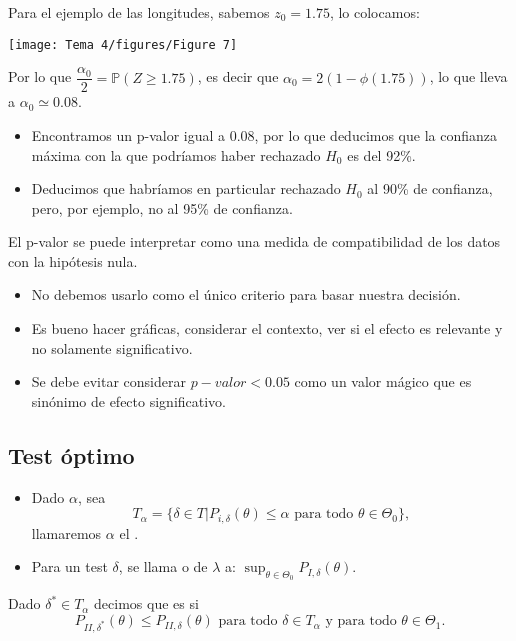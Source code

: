 Para el ejemplo de las longitudes, sabemos $z_0=1.75$, lo colocamos:
\begin{center}
    \texttt{[image: Tema 4/figures/Figure 7]}
\end{center}
Por lo que $\dfrac{\alpha_0}{2}=\mathbb{P}(Z\ge 1.75)$, es decir que $\alpha_0=2(1-\phi(1.75))$, lo que lleva a $\alpha_0\simeq 0.08$.
\begin{tcolorbox}[colback=olive!5!white, colframe=olive!75!black, title=\textbf{Para nuestro ejemplo}]
\begin{itemize}[label=\textbullet]
    \item Encontramos un  p-valor igual a 0.08, por lo que deducimos que la confianza máxima con la que podríamos haber rechazado $H_0$ es del 92\%.
    \item Deducimos que habríamos en particular rechazado $H_0$ al 90\% de confianza, pero, por ejemplo, no al 95\% de confianza.
\end{itemize}
\end{tcolorbox}
\begin{tcolorbox}[colback=olive!5!white, colframe=olive!75!black, title=\textbf{Cuidado con la interpretaión del p-valor}]
El p-valor se puede interpretar como una medida de compatibilidad de los datos con la hipótesis nula.
\begin{itemize}[label=\textbullet]
    \item No debemos usarlo como el único criterio para basar nuestra decisión.
    \item Es bueno hacer gráficas, considerar el contexto, ver si el efecto es relevante y no solamente significativo.
    \item Se debe evitar considerar $p-valor<0.05$ como un valor mágico que es sinónimo de efecto significativo.
\end{itemize}
\end{tcolorbox}
\subsection{Test óptimo}
\begin{tcolorbox}[colback=blue!5!white, colframe=blue!75!black, title=\textbf{Empezamos por considerar los tests con probabilidad de error tipo I menor o igual que $\alpha$:}]
\begin{itemize}[label=\textbullet]
    \item Dado $\alpha$, sea \[
    T_\alpha=\{\delta\in T|P_{i,\delta}(\theta)\le \alpha \text{ para todo }\theta\in \Theta_0\},
    \] llamaremos $\alpha$ el .
\item Para un test $\delta$, se llama   o  de $\lambda$ a:  $\sup_{\theta\in \Theta_0}P_{I,\delta}(\theta)$.  
\end{itemize}
\end{tcolorbox}
\begin{tcolorbox}[colback=blue!5!white, colframe=blue!75!black, title=\textbf{Definición}]
Dado $\delta^*\in T_\alpha$ decimos que es  si \[
P_{II,\delta^*}(\theta)\le P_{II,\delta}(\theta)\text{ para todo $\delta\in T_\alpha$ y para todo $\theta\in \Theta_1$.}
\]  
\end{tcolorbox}
